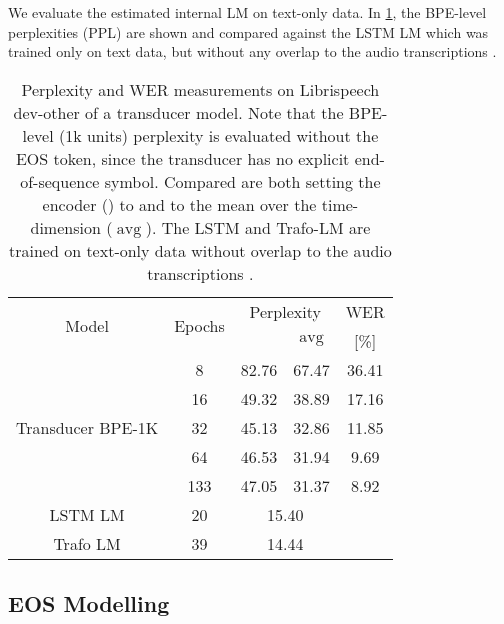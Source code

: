 \documentclass[a4paper]{article}
\newcommand{\ilmAvgName}{\ensuremath{\operatorname{avg}}}
\begin{document}
We evaluate the estimated internal LM on
text-only data.
In \cref{tab:internal_lm_estimation}, the BPE-level perplexities (PPL)
are shown and compared against the LSTM LM which was
trained only on text data,
but without any overlap to the audio transcriptions \cite{panayotov2015librispeech}.




\begin{table}[t]
\centering
\caption[Internal LM estimation on Librispeech]{Perplexity and WER measurements on Librispeech dev-other of a transducer model.
Note that the BPE-level (1k units) perplexity is evaluated without the EOS token, since the transducer has no explicit end-of-sequence symbol.
Compared are both setting the encoder () to  and to the mean over the time-dimension (\ilmAvgName).
The LSTM and Trafo-LM are trained on text-only data without overlap to
the audio transcriptions \cite{panayotov2015librispeech}.
}
\label{tab:internal_lm_estimation}
\begin{tabular}{|c|c|c|c|c|}
\hline
\multirow{2}{*}{Model} & \multirow{2}{*}{Epochs} & \multicolumn{2}{c|}{Perplexity} & WER\\
 &  &  & \ilmAvgName & [\%]\\
\hline\hline
\multirow{5}{*}{Transducer BPE-1K} & 8 & 82.76 & 67.47 & 36.41\\
\cline{2-5}
& 16 & 49.32 & 38.89 & 17.16\\
\cline{2-5}
& 32 & 45.13 & 32.86 & 11.85\\
\cline{2-5}
& 64 & 46.53 & 31.94 & \phantom{0}9.69\\
\cline{2-5}
& 133 & 47.05 & 31.37 & \phantom{0}8.92\\
\hline
LSTM LM & 20 & \multicolumn{2}{c|}{15.40} & \\
\hline
Trafo LM & 39 & \multicolumn{2}{c|}{14.44} & \\
\hline
\end{tabular}
\end{table}















\subsection{EOS Modelling}
\label{sec:lm_eos_modelling}
\end{document}
